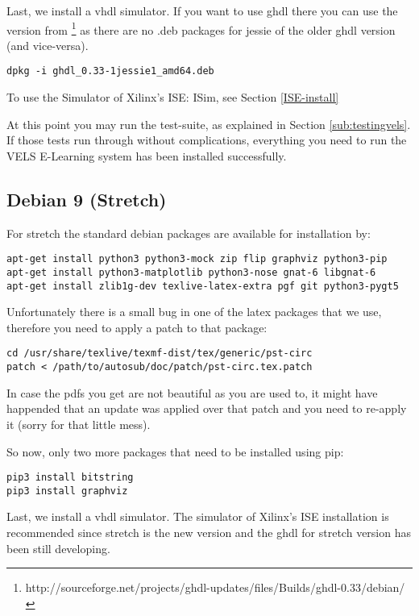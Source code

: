Last, we install a vhdl simulator. If you want to use ghdl there you can use the version from \footnote{http://sourceforge.net/projects/ghdl-updates/files/Builds/ghdl-0.33/debian/} as there are no .deb packages for jessie of the older ghdl version (and vice-versa).

\begin{verbatim}
dpkg -i ghdl_0.33-1jessie1_amd64.deb
\end{verbatim}

To use the Simulator of Xilinx's ISE: ISim, see Section \ref{ISE-install}

At this point you may run the test-suite, as explained in Section \ref{sub:testingvels}.
If those tests run through without complications, everything you need to run the VELS
E-Learning system has been installed successfully.

\subsection{Debian 9 (Stretch)}

For stretch the standard debian packages are available for installation by:

\begin{verbatim}
apt-get install python3 python3-mock zip flip graphviz python3-pip
apt-get install python3-matplotlib python3-nose gnat-6 libgnat-6 
apt-get install zlib1g-dev texlive-latex-extra pgf git python3-pygt5
\end{verbatim}

Unfortunately there is a small bug in one of the latex packages that we use,
therefore you need to apply a patch to that package:

\begin{verbatim}
cd /usr/share/texlive/texmf-dist/tex/generic/pst-circ
patch < /path/to/autosub/doc/patch/pst-circ.tex.patch
\end{verbatim}

In case the pdfs you get are not beautiful as you are used to, it might have
happended that an update was applied over that patch and you need to re-apply it (sorry for that little mess).

So now, only two more packages that need to be installed using pip:

\begin{verbatim}
pip3 install bitstring
pip3 install graphviz
\end{verbatim}

Last, we install a vhdl simulator. The simulator of Xilinx's ISE installation is recommended since stretch is the new version and the ghdl for stretch version has been still developing. 

